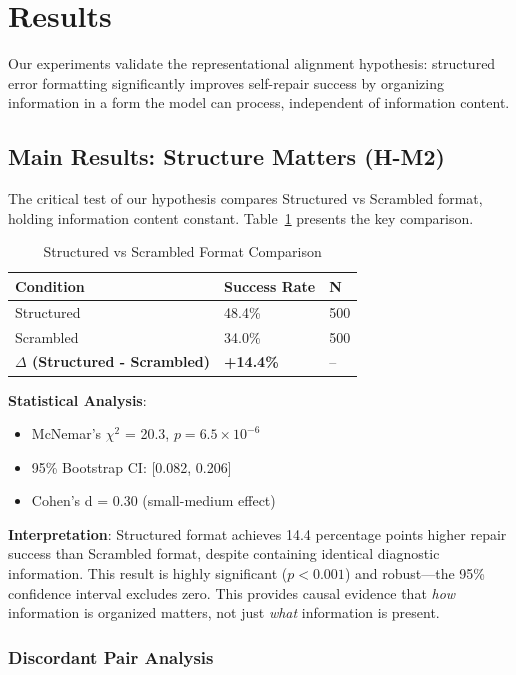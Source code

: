 \section{Results}

Our experiments validate the representational alignment hypothesis: structured error formatting significantly improves self-repair success by organizing information in a form the model can process, independent of information content.

\subsection{Main Results: Structure Matters (H-M2)}

The critical test of our hypothesis compares Structured vs Scrambled format, holding information content constant. Table~\ref{tab:main_results} presents the key comparison.

\begin{table}[H]
\centering
\begin{tabular}{@{}lll@{}}
\toprule
\textbf{Condition} & \textbf{Success Rate} & \textbf{N} \\
\midrule
Structured & 48.4\% & 500 \\
Scrambled & 34.0\% & 500 \\
\textbf{$\Delta$ (Structured - Scrambled)} & \textbf{+14.4\%} & -- \\
\bottomrule
\end{tabular}
\caption{Structured vs Scrambled Format Comparison}
\label{tab:main_results}
\end{table}

\textbf{Statistical Analysis}:
\begin{itemize}
    \item McNemar's $\chi^2$ = 20.3, $p = 6.5 \times 10^{-6}$
    \item 95\% Bootstrap CI: [0.082, 0.206]
    \item Cohen's d = 0.30 (small-medium effect)
\end{itemize}

\textbf{Interpretation}: Structured format achieves 14.4 percentage points higher repair success than Scrambled format, despite containing identical diagnostic information. This result is highly significant ($p < 0.001$) and robust---the 95\% confidence interval excludes zero. This provides causal evidence that \emph{how} information is organized matters, not just \emph{what} information is present.

\subsubsection{Discordant Pair Analysis}

